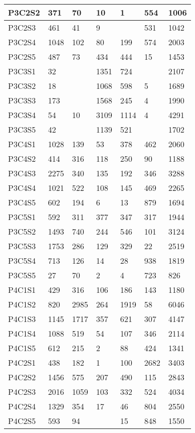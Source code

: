 \begin{longtable}{|l|l|l|l|l|l|l|}
P3C2S2 & 371 & 70 & 10 & 1 & 554 & 1006 \\ \hline
P3C2S3 & 461 & 41 & 9 &  & 531 & 1042 \\ \hline
P3C2S4 & 1048 & 102 & 80 & 199 & 574 & 2003 \\ \hline
P3C2S5 & 487 & 73 & 434 & 444 & 15 & 1453 \\ \hline
P3C3S1 & 32 &  & 1351 & 724 &  & 2107 \\ \hline
P3C3S2 & 18 &  & 1068 & 598 & 5 & 1689 \\ \hline
P3C3S3 & 173 &  & 1568 & 245 & 4 & 1990 \\ \hline
P3C3S4 & 54 & 10 & 3109 & 1114 & 4 & 4291 \\ \hline
P3C3S5 & 42 &  & 1139 & 521 &  & 1702 \\ \hline
P3C4S1 & 1028 & 139 & 53 & 378 & 462 & 2060 \\ \hline
P3C4S2 & 414 & 316 & 118 & 250 & 90 & 1188 \\ \hline
P3C4S3 & 2275 & 340 & 135 & 192 & 346 & 3288 \\ \hline
P3C4S4 & 1021 & 522 & 108 & 145 & 469 & 2265 \\ \hline
P3C4S5 & 602 & 194 & 6 & 13 & 879 & 1694 \\ \hline
P3C5S1 & 592 & 311 & 377 & 347 & 317 & 1944 \\ \hline
P3C5S2 & 1493 & 740 & 244 & 546 & 101 & 3124 \\ \hline
P3C5S3 & 1753 & 286 & 129 & 329 & 22 & 2519 \\ \hline
P3C5S4 & 713 & 126 & 14 & 28 & 938 & 1819 \\ \hline
P3C5S5 & 27 & 70 & 2 & 4 & 723 & 826 \\ \hline
P4C1S1 & 429 & 316 & 106 & 186 & 143 & 1180 \\ \hline
P4C1S2 & 820 & 2985 & 264 & 1919 & 58 & 6046 \\ \hline
P4C1S3 & 1145 & 1717 & 357 & 621 & 307 & 4147 \\ \hline
P4C1S4 & 1088 & 519 & 54 & 107 & 346 & 2114 \\ \hline
P4C1S5 & 612 & 215 & 2 & 88 & 424 & 1341 \\ \hline
P4C2S1 & 438 & 182 & 1 & 100 & 2682 & 3403 \\ \hline
P4C2S2 & 1456 & 575 & 207 & 490 & 115 & 2843 \\ \hline
P4C2S3 & 2016 & 1059 & 103 & 332 & 524 & 4034 \\ \hline
P4C2S4 & 1329 & 354 & 17 & 46 & 804 & 2550 \\ \hline
P4C2S5 & 593 & 94 &  & 15 & 848 & 1550 \\ \hline

\end{longtable}
